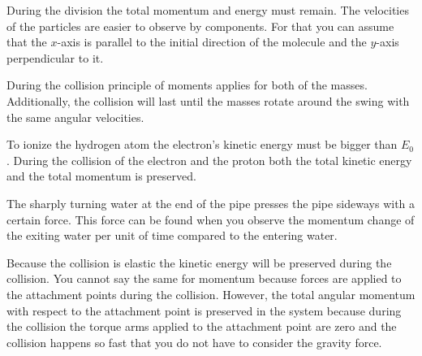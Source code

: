 \documentclass[11pt]{article}
\begin{document}

\hinteng
During the division the total momentum and energy must remain. The velocities of the particles are easier to observe by components. For that you can assume that the $x$-axis is parallel to the initial direction of the molecule and the $y$-axis perpendicular to it.
\probend
\bigskip


\hinteng
During the collision principle of moments applies for both of the masses. Additionally, the collision will last until the masses rotate around the swing with the same angular velocities.
\probend
\bigskip


\hinteng
To ionize the hydrogen atom the electron’s kinetic energy must be bigger than $E_0$. During the collision of the electron and the proton both the total kinetic energy and the total momentum is preserved.
\probend
\bigskip


\hinteng
The sharply turning water at the end of the pipe presses the pipe sideways with a certain force. This force can be found when you observe the momentum change of the exiting water per unit of time compared to the entering water.
\probend
\bigskip


\hinteng
Because the collision is elastic the kinetic energy will be preserved during the collision. You cannot say the same for momentum because forces are applied to the attachment points during the collision. However, the total angular momentum with respect to the attachment point is preserved in the system because during the collision the torque arms applied to the attachment point are zero and the collision happens so fast that you do not have to consider the gravity force.
\probend
\bigskip
\end{document}
